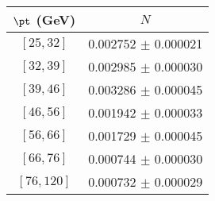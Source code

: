 \begin{tabular}{c||c}
$\pt$ (GeV) & $N$  \\
\hline
$[25, 32]$ & 0.002752 $\pm$ 0.000021\\
$[32, 39]$ & 0.002985 $\pm$ 0.000030\\
$[39, 46]$ & 0.003286 $\pm$ 0.000045\\
$[46, 56]$ & 0.001942 $\pm$ 0.000033\\
$[56, 66]$ & 0.001729 $\pm$ 0.000045\\
$[66, 76]$ & 0.000744 $\pm$ 0.000030\\
$[76, 120]$ & 0.000732 $\pm$ 0.000029\\
\end{tabular}
